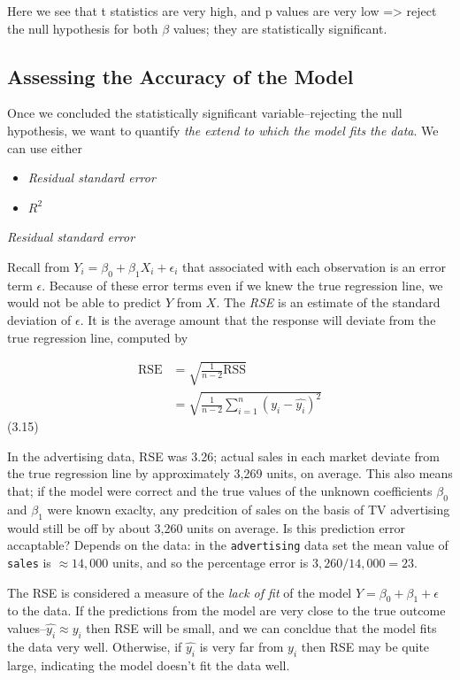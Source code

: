 \documentclass[
  letterpaper,
  DIV=11,
  numbers=noendperiod]{scrreprt}
\providecommand{\tightlist}{%
  \setlength{\itemsep}{0pt}\setlength{\parskip}{0pt}}\usepackage{longtable,booktabs,array}
\begin{document}
Here we see that t statistics are very high, and p values are very low
=\textgreater{} reject the null hypothesis for both \(\beta\) values;
they are statistically significant.

\hypertarget{assessing-the-accuracy-of-the-model}{%
\subsection{Assessing the Accuracy of the
Model}\label{assessing-the-accuracy-of-the-model}}

Once we concluded the statistically significant variable--rejecting the
null hypothesis, we want to quantify \emph{the extend to which the model
fits the data}. We can use either

\begin{itemize}
\tightlist
\item
  \emph{Residual standard error}
\item
  \(R^2\)
\end{itemize}

\emph{Residual standard error}

Recall from \(Y_i = \beta_0 + \beta_1 X_i + \epsilon_i\) that associated
with each observation is an error term \(\epsilon\). Because of these
error terms even if we knew the true regression line, we would not be
able to predict \(Y\) from \(X\). The \emph{RSE} is an estimate of the
standard deviation of \(\epsilon\). It is the average amount that the
response will deviate from the true regression line, computed by

\[
\begin{align}
\text{RSE} &= \sqrt{\frac{1}{n-2}\text{RSS}} \\
&= \sqrt{\frac{1}{n-2}\sum_{i=1}^n(y_i - \hat{y_i})^2}
\end{align}
\] (3.15)

In the advertising data, RSE was 3.26; actual sales in each market
deviate from the true regression line by approximately 3,269 units, on
average. This also means that; if the model were correct and the true
values of the unknown coefficients \(\beta_0\) and \(\beta_1\) were
known exaclty, any predcition of sales on the basis of TV advertising
would still be off by about 3,260 units on average. Is this prediction
error accaptable? Depends on the data: in the \texttt{advertising} data
set the mean value of \texttt{sales} is \(\approx 14,000\) units, and so
the percentage error is \(3,260 / 14,000 = 23%
\).

The RSE is considered a measure of the \emph{lack of fit} of the model
\(Y=\beta_0 + \beta_1 + \epsilon\) to the data. If the predictions from
the model are very close to the true outcome
values--\(\hat{y_i} \approx y_i\) then RSE will be small, and we can
concldue that the model fits the data very well. Otherwise, if
\(\hat{y_i}\) is very far from \(y_i\) then RSE may be quite large,
indicating the model doesn't fit the data well.
\end{document}
